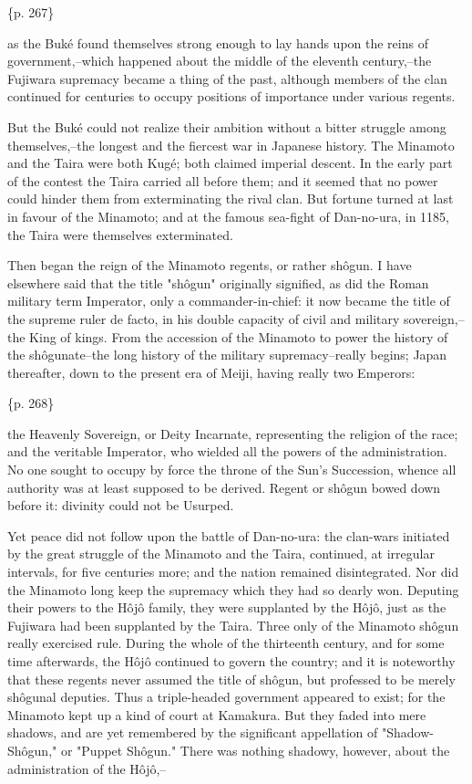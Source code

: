 \{p. 267\}

as the Buké found themselves strong enough to lay hands upon the reins of government,--which happened about the middle of the eleventh century,--the Fujiwara supremacy became a thing of the past, although members of the clan continued for centuries to occupy positions of importance under various regents.

But the Buké could not realize their ambition without a bitter struggle among themselves,--the longest and the fiercest war in Japanese history. The Minamoto and the Taira were both Kugé; both claimed imperial descent. In the early part of the contest the Taira carried all before them; and it seemed that no power could hinder them from exterminating the rival clan. But fortune turned at last in favour of the Minamoto; and at the famous sea-fight of Dan-no-ura, in 1185, the Taira were themselves exterminated.

Then began the reign of the Minamoto regents, or rather shôgun. I have elsewhere said that the title "shôgun" originally signified, as did the Roman military term Imperator, only a commander-in-chief: it now became the title of the supreme ruler de facto, in his double capacity of civil and military sovereign,--the King of kings. From the accession of the Minamoto to power the history of the shôgunate--the long history of the military supremacy--really begins; Japan thereafter, down to the present era of Meiji, having really two Emperors:

\{p. 268\}

the Heavenly Sovereign, or Deity Incarnate, representing the religion of the race; and the veritable Imperator, who wielded all the powers of the administration. No one sought to occupy by force the throne of the Sun's Succession, whence all authority was at least supposed to be derived. Regent or shôgun bowed down before it: divinity could not be Usurped.

Yet peace did not follow upon the battle of Dan-no-ura: the clan-wars initiated by the great struggle of the Minamoto and the Taira, continued, at irregular intervals, for five centuries more; and the nation remained disintegrated. Nor did the Minamoto long keep the supremacy which they had so dearly won. Deputing their powers to the Hôjô family, they were supplanted by the Hôjô, just as the Fujiwara had been supplanted by the Taira. Three only of the Minamoto shôgun really exercised rule. During the whole of the thirteenth century, and for some time afterwards, the Hôjô continued to govern the country; and it is noteworthy that these regents never assumed the title of shôgun, but professed to be merely shôgunal deputies. Thus a triple-headed government appeared to exist; for the Minamoto kept up a kind of court at Kamakura. But they faded into mere shadows, and are yet remembered by the significant appellation of "Shadow-Shôgun," or "Puppet Shôgun." There was nothing shadowy, however, about the administration of the Hôjô,--

